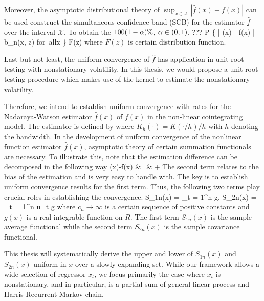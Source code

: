Moreover, the asymptotic distributional theory of $\sup_{x \in \mathcal{X}} |\hat{f}(x) - f(x)|$ can be used construct the simultaneous confidence band (SCB) for the estimator $\hat{f}$ over the interval $\mathcal{X}$. To obtain the $100 (1 - \alpha)\%$, $\alpha \in (0,1)$, ???
\bestar
 P \big \{ | (x) -  f(x) |  \le b_n(x, z) \quad  \mbox{for all}\quad  x \in {} \big \}  \to F(z)
\eestar
where $F(z)$ is certain distribution function.

Last but not least, the uniform convergence of $\hat{f}$ has application in unit root testing with nonstationary volatility. In this thesis, we would propose a unit root testing procedure which makes use of the kernel to estimate the nonstationary volatility. 



Therefore, we intend to establish uniform convergence with rates for the Nadaraya-Watson estimator $\hat{f}(x)$ of $f(x)$ in the non-linear cointegrating model. The estimator is defined by
where $K_h(\cdot) = K(\cdot / h)/h$ with $h$ denoting the bandwidth. In the development of uniform convergence of the nonlinear function estimator $\hat{f}(x)$, asymptotic theory of certain summation functionals are necessary. To illustrate this, note that the estimation difference can be decomposed in the following way
\bestar
	(x)-f(x) &=& +
\eestar
The second term relates to the bias of the estimation and is very easy to handle with. The key is to establish uniform convergence results for the first term. Thus, the following two terms play crucial roles in establishing the convergence.
\be
  S_{1n}(x) = \sum_{t = 1}^n g\big [c_n(x_t - x) \big], \qquad S_{2n}(x) = \sum_{t = 1}^n u_t g\big [c_n(x_t - x) \big]
\ee
where $c_n\to \infty$ is a certain sequence of positive constants and $g(x)$ is a real integrable function on $R$. The first term $S_{1n}(x)$ is the sample average functional while the second term $S_{2n}(x)$ is the sample covariance functional.

This thesis will systematically derive the upper and lower of $S_{1n}(x)$ and $S_{2n}(x)$ uniform in $x$ over a slowly expanding set. While our framework allows a wide selection of regressor $x_t$, we focus primarily the case where $x_t$ is nonstationary, and in particular, is a partial sum of general linear process and Harris Recurrent Markov chain.

